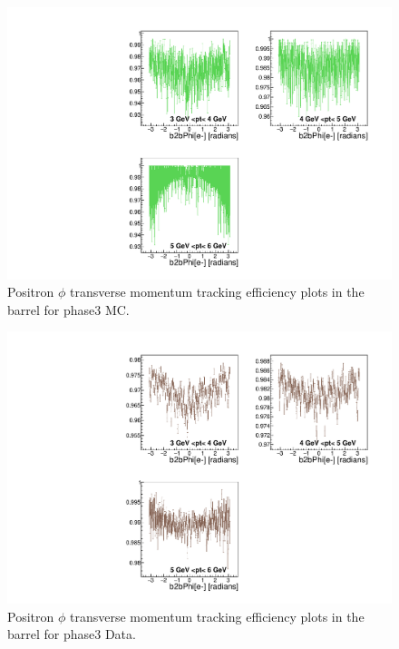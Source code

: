 \documentclass[a4paper,11pt,twosided,final,german,openbib,pdftex,listof=totoc,bibliography=totoc]{scrbook}
\begin{document}
\begin{appendix}
\begin{figure}[!htbp]
	\centering
	\includegraphics[width=\textwidth]{Plots/master3/xPtMPhiepBarrel_MCP3}
	\caption[Transverse Momentum $\phi$ Positron Barrel Efficiency Phase3 MC]{Positron $\phi$ transverse momentum tracking efficiency plots in the barrel for phase3 MC.}
	\label{plt:PtMPhiepBarrel3_MC}
\end{figure}


\begin{figure}[!htbp]
	\centering
	\includegraphics[width=\textwidth]{Plots/master3/xPtMPhiepBarrel_DataP3}
	\caption[Transverse Momentum $\phi$ Positron Barrel Efficiency Phase3 Data]{Positron $\phi$ transverse  momentum tracking efficiency plots in the barrel for phase3 Data.}
	\label{plt:PtMPhiepBarrel3_Data}
\end{figure}



\end{appendix}
\end{document}
